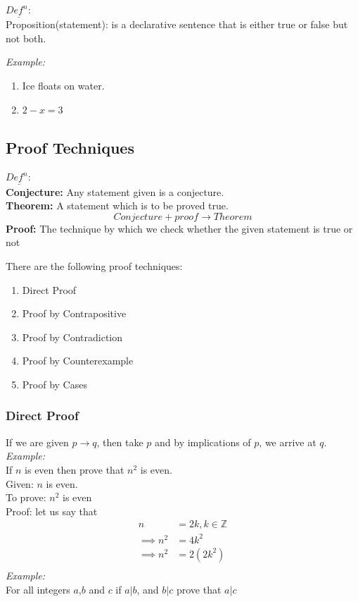 \documentclass[11pt,letterpaper]{article}
\newenvironment{example}                             
        {\noindent\textit{Example:}\\}
	{}
\newenvironment{definition}
	{\begin{mdframed}$\underline{\textit{Def}^\textit{n}:} $\\}
	{\end{mdframed}}
\begin{document}
\begin{definition}
  Proposition(statement): is a declarative sentence that is either true or false but not both.
\end{definition}

\begin{example}
  \begin{enumerate}
    \item Ice floats on water. 
    \item $2-x = 3$
  \end{enumerate}
\end{example}
\subsection{Proof Techniques}
\begin{definition}
  \textbf{Conjecture:} Any statement given is a conjecture.\\
  \textbf{Theorem:} A statement which is to be proved true.\\
  \[
    Conjecture + proof \rightarrow Theorem
  \]
  \textbf{Proof:} The technique by which we check whether the given statement is true or not\\
\end{definition}

There are the following proof techniques:

\begin{enumerate}
  \item Direct Proof
  \item Proof by Contrapositive
  \item Proof by Contradiction
  \item Proof by Counterexample
  \item Proof by Cases
\end{enumerate}

\subsubsection{Direct Proof}
If we are given $p \to q$, then take $p$ and by implications of $p$, we arrive at $q$.\\
\begin{example}
  If $n$ is even then prove that $n^2$ is even.\\

  Given: $n$ is even.\\
  To prove: $n^2$ is even\\
  Proof: let us say that \\
  \begin{align*}
    n &= 2k, k \in \mathbb{Z}\\
    \implies n^2 &= 4k^2\\
    \implies n^2 &= 2(2k^2)\\
  \end{align*}
\end{example}
\begin{example}
  For all integers $a$,$b$ and $c$ if $a|b$, and $b|c$ prove that $a|c$

\end{example}
\end{document}
